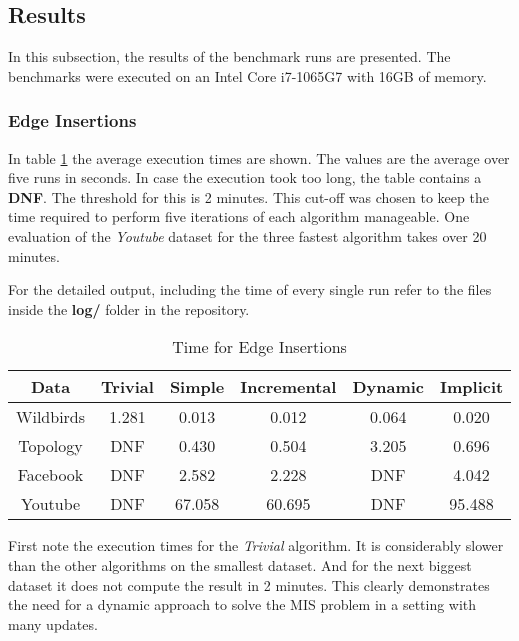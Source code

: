 \documentclass[letterpaper,12pt]{article}
\begin{document}
\subsection{Results}

In this subsection, the results of the benchmark runs are presented. 
The benchmarks were executed on an Intel Core i7-1065G7 with 16GB of memory.

\subsubsection{Edge Insertions}

In table \ref{tab:insertion} the average execution times are shown. The values
are the average over five runs in seconds. In case the execution took too long,
the table contains a \textbf{DNF}.
The threshold for this is 2 minutes. This cut-off was chosen to keep the time required
to perform five iterations of each algorithm manageable. One evaluation of the \textit{Youtube}
dataset for the three fastest algorithm takes over 20 minutes.

For the detailed output, including the time of every single run refer to the
files inside the \textbf{log/} folder in the repository.

\begin{table}[H]
  \caption{Time for Edge Insertions}
  \label{tab:insertion}
  \centering
  \setlength{\extrarowheight}{0.3em}
  \begin{tabular}{|c|c|c|c|c|c|}
    \hline
    Data & Trivial & Simple & Incremental & Dynamic & Implicit \\
    \hline
    \hline
    Wildbirds & 1.281 & 0.013 & 0.012 & 0.064 & 0.020 \\
    \hline
    Topology & DNF & 0.430 & 0.504 & 3.205 & 0.696 \\
    \hline
    Facebook & DNF & 2.582 & 2.228 & DNF & 4.042 \\
    \hline
    Youtube & DNF & 67.058 & 60.695 & DNF & 95.488 \\
    \hline
  \end{tabular}
\end{table}

First note the execution times for the \textit{Trivial} algorithm.
It is considerably slower than the other algorithms on the smallest dataset.
And for the next biggest dataset it does not compute the result in 2 minutes.
This clearly demonstrates the need for a dynamic approach to solve the MIS
problem in a setting with many updates.
\end{document}
